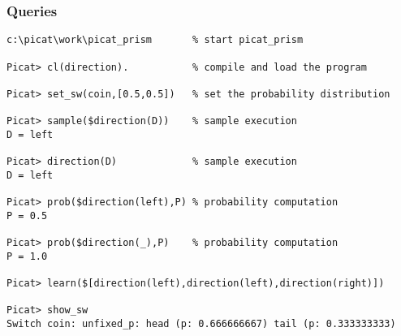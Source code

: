 \subsubsection*{Queries}
\begin{verbatim}
c:\picat\work\picat_prism       % start picat_prism

Picat> cl(direction).           % compile and load the program

Picat> set_sw(coin,[0.5,0.5])   % set the probability distribution

Picat> sample($direction(D))    % sample execution
D = left

Picat> direction(D)             % sample execution
D = left

Picat> prob($direction(left),P) % probability computation
P = 0.5

Picat> prob($direction(_),P)    % probability computation
P = 1.0

Picat> learn($[direction(left),direction(left),direction(right)])

Picat> show_sw
Switch coin: unfixed_p: head (p: 0.666666667) tail (p: 0.333333333)
\end{verbatim}



